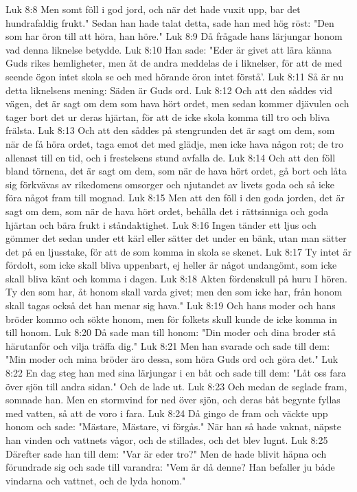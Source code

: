 Luk 8:8  Men somt föll i god jord, och när det hade vuxit upp, bar det hundrafaldig frukt." Sedan han hade talat detta, sade han med hög röst: "Den som har öron till att höra, han höre."
Luk 8:9  Då frågade hans lärjungar honom vad denna liknelse betydde.
Luk 8:10  Han sade: "Eder är givet att lära känna Guds rikes hemligheter, men åt de andra meddelas de i liknelser, för att de med seende ögon intet skola se och med hörande öron intet förstå'.
Luk 8:11  Så är nu detta liknelsens mening: Säden är Guds ord.
Luk 8:12  Och att den såddes vid vägen, det är sagt om dem som hava hört ordet, men sedan kommer djävulen och tager bort det ur deras hjärtan, för att de icke skola komma till tro och bliva frälsta.
Luk 8:13  Och att den såddes på stengrunden det är sagt om dem, som när de få höra ordet, taga emot det med glädje, men icke hava någon rot; de tro allenast till en tid, och i frestelsens stund avfalla de.
Luk 8:14  Och att den föll bland törnena, det är sagt om dem, som när de hava hört ordet, gå bort och låta sig förkvävas av rikedomens omsorger och njutandet av livets goda och så icke föra något fram till mognad.
Luk 8:15  Men att den föll i den goda jorden, det är sagt om dem, som när de hava hört ordet, behålla det i rättsinniga och goda hjärtan och bära frukt i ståndaktighet.
Luk 8:16  Ingen tänder ett ljus och gömmer det sedan under ett kärl eller sätter det under en bänk, utan man sätter det på en ljusstake, för att de som komma in skola se skenet.
Luk 8:17  Ty intet är fördolt, som icke skall bliva uppenbart, ej heller är något undangömt, som icke skall bliva känt och komma i dagen.
Luk 8:18  Akten fördenskull på huru I hören. Ty den som har, åt honom skall varda givet; men den som icke har, från honom skall tagas också det han menar sig hava."
Luk 8:19  Och hans moder och hans bröder kommo och sökte honom, men för folkets skull kunde de icke komma in till honom.
Luk 8:20  Då sade man till honom: "Din moder och dina broder stå härutanför och vilja träffa dig."
Luk 8:21  Men han svarade och sade till dem: "Min moder och mina bröder äro dessa, som höra Guds ord och göra det."
Luk 8:22  En dag steg han med sina lärjungar i en båt och sade till dem: "Låt oss fara över sjön till andra sidan." Och de lade ut.
Luk 8:23  Och medan de seglade fram, somnade han. Men en stormvind for ned över sjön, och deras båt begynte fyllas med vatten, så att de voro i fara.
Luk 8:24  Då gingo de fram och väckte upp honom och sade: "Mästare, Mästare, vi förgås." När han så hade vaknat, näpste han vinden och vattnets vågor, och de stillades, och det blev lugnt.
Luk 8:25  Därefter sade han till dem: "Var är eder tro?" Men de hade blivit häpna och förundrade sig och sade till varandra: "Vem är då denne? Han befaller ju både vindarna och vattnet, och de lyda honom."
